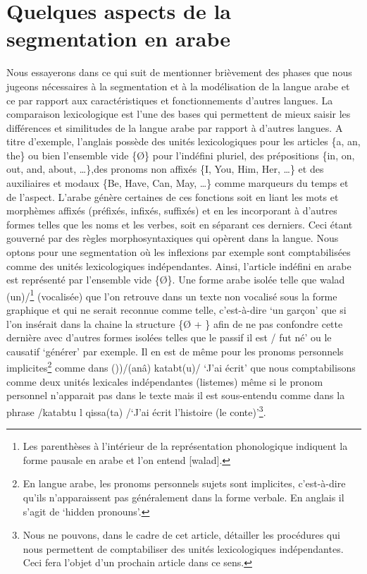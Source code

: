 \documentclass[french]{textolivre}
\begin{document}
\section{Quelques aspects de la segmentation en arabe}
Nous essayerons dans ce qui suit de mentionner brièvement des phases que nous jugeons nécessaires à la segmentation et à la modélisation de la langue arabe et ce par rapport aux caractéristiques et fonctionnements d’autres langues. La comparaison lexicologique est l’une des bases qui permettent de mieux saisir les différences et similitudes de la langue arabe par rapport à d’autres langues. A titre d’exemple, l’anglais possède des unités lexicologiques pour les articles \{a, an, the\} ou bien l’ensemble vide \{Ø\} pour l’indéfini pluriel, des prépositions \{in, on, out, and, about, …\},des pronoms non affixés \{I, You, Him, Her, …\} et des auxiliaires et modaux \{Be, Have, Can, May, …\} comme marqueurs du temps et de l'aspect. L’arabe génère certaines de ces fonctions soit en liant les mots et morphèmes affixés (préfixés, infixés, suffixés) et en les incorporant à d’autres formes telles que les noms et les verbes, soit en séparant ces derniers. Ceci étant gouverné par des règles morphosyntaxiques qui opèrent dans la langue. Nous optons pour une segmentation où les inflexions par exemple sont comptabilisées comme des unités lexicologiques indépendantes. Ainsi, l’article indéfini en arabe est représenté par l’ensemble vide \{Ø\}. Une forme arabe isolée telle que  walad (un)/\footnote{Les parenthèses à l’intérieur de la représentation phonologique indiquent la forme pausale en arabe et l’on entend [walad].} (vocalisée) que l’on retrouve dans un texte non vocalisé sous la forme graphique   et qui ne serait reconnue comme telle, c’est-à-dire ‘un garçon’ que si l’on insérait dans la chaine la structure \{Ø + \} afin de ne pas confondre cette dernière avec d’autres formes isolées telles que le passif  il est / fut né’ ou le causatif  ‘générer’ par exemple. Il en est de même pour les pronoms personnels implicites\footnote{En langue arabe, les pronoms personnels sujets sont implicites, c’est-à-dire qu’ils n’apparaissent pas généralement dans la forme verbale. En anglais il s’agit de ‘hidden pronouns’.} comme dans ())/(anâ) katabt(u)/ ‘J’ai écrit’ que nous comptabilisons comme deux unités lexicales indépendantes (listemes) même si le pronom personnel  n’apparait pas dans le texte mais il est sous-entendu comme dans la phrase  /katabtu l qissa(ta) /‘J’ai écrit l’histoire (le conte)'\footnote{Nous ne pouvons, dans le cadre de cet article, détailler les procédures qui nous permettent de comptabiliser des unités lexicologiques indépendantes. Ceci fera l’objet d’un prochain article dans ce sens.}.
\end{document}
